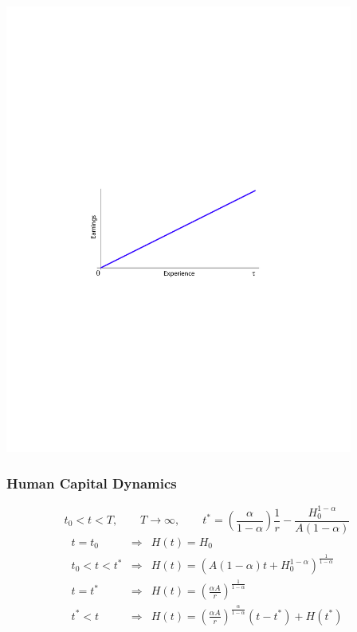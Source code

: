 \documentclass[12pt,compress,handout]{beamer}  %
\begin{document}
\begin{frame}

\includegraphics[width=4.5in]{include/fig-earnings-experience}
\end{frame}


\begin{frame}
\frametitle{Human Capital Dynamics}
\begin{equation*}
    t_{0} < t < T, \qquad T \rightarrow \infty, \qquad t^{*} = \left( \frac{\alpha}{1-\alpha} \right) \frac{1}{r} -
    \frac{H_{0}^{1-\alpha}}{A(1-\alpha)}
\end{equation*}
\begin{eqnarray*}
  t = t_{0} &\Rightarrow& H(t) = H_{0} \\
  t_{0} < t < t^{*} &\Rightarrow& H(t) = (A(1-\alpha)t +
    H_{0}^{1-\alpha})^{\frac{1}{1-\alpha}} \\
  t = t^{*} &\Rightarrow& H(t) = \left( \frac{\alpha A}{r}
    \right)^{\frac{1}{1-\alpha}} \\
  t^{*} < t &\Rightarrow& H(t) = \left( \frac{\alpha A}{r}
    \right)^{\frac{\alpha}{1-\alpha}}(t - t^{*}) + H(t^{*})
\end{eqnarray*}
\end{frame}
\end{document}
